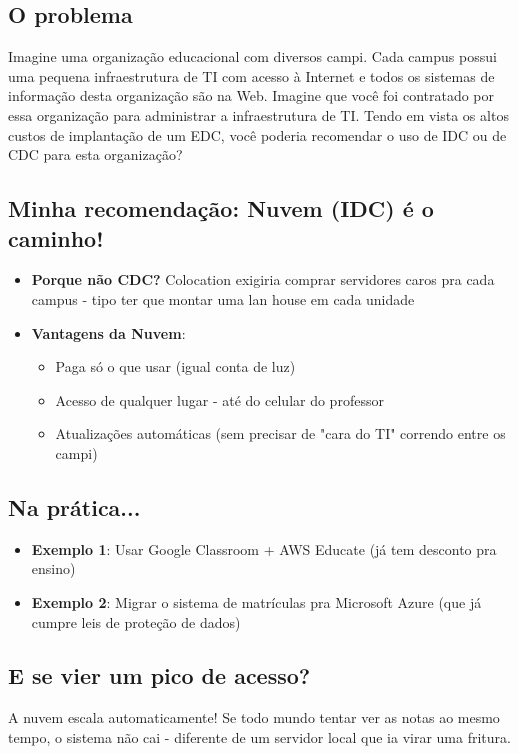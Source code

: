 \documentclass{article}
\begin{document}
\subsection*{O problema}
Imagine uma organização educacional com diversos campi. Cada campus possui uma pequena infraestrutura de TI com acesso à Internet e todos os sistemas de informação desta organização são na Web. Imagine que você foi contratado por essa organização para administrar a infraestrutura de TI. Tendo em vista os altos custos de implantação de um EDC, você poderia recomendar o uso de IDC ou de CDC para esta organização?
\subsection*{Minha recomendação: Nuvem (IDC) é o caminho!}
\begin{itemize}
    \item \textbf{Porque não CDC?} Colocation exigiria comprar servidores caros pra cada campus - tipo ter que montar uma lan house em cada unidade
    \item \textbf{Vantagens da Nuvem}:
    \begin{itemize}
        \item Paga só o que usar (igual conta de luz)
        \item Acesso de qualquer lugar - até do celular do professor
        \item Atualizações automáticas (sem precisar de "cara do TI" correndo entre os campi)
    \end{itemize}
\end{itemize}

\subsection*{Na prática...}
\begin{itemize}
    \item \textbf{Exemplo 1}: Usar Google Classroom + AWS Educate (já tem desconto pra ensino)
    \item \textbf{Exemplo 2}: Migrar o sistema de matrículas pra Microsoft Azure (que já cumpre leis de proteção de dados)
\end{itemize}

\subsection*{E se vier um pico de acesso?}
A nuvem escala automaticamente! Se todo mundo tentar ver as notas ao mesmo tempo, o sistema não cai - diferente de um servidor local que ia virar uma fritura.
\end{document}
